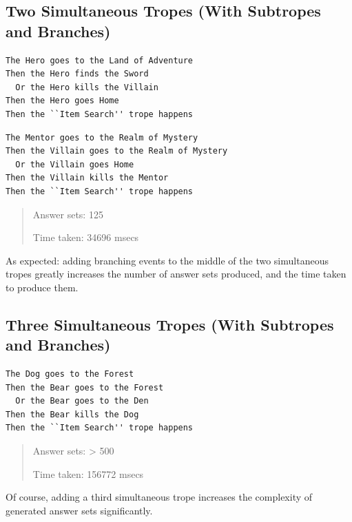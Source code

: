 \documentclass[11pt]{report}
\begin{document}
\subsection{Two Simultaneous Tropes (With Subtropes and Branches)}

\begin{lstlisting}[showstringspaces=false, label={lst:ex-simtrope1b},
caption={First of two simultaneous tropes (with subtropes and branches)}]
The Hero goes to the Land of Adventure
Then the Hero finds the Sword
  Or the Hero kills the Villain
Then the Hero goes Home
Then the ``Item Search'' trope happens
\end{lstlisting}

\begin{lstlisting}[showstringspaces=false, label={lst:ex-simtrope2b},
caption={Second of two simultaneous tropes (with subtropes and branches)}]
The Mentor goes to the Realm of Mystery
Then the Villain goes to the Realm of Mystery
  Or the Villain goes Home
Then the Villain kills the Mentor
Then the ``Item Search'' trope happens
\end{lstlisting}

\begin{quote}
Answer sets: 125

Time taken: 34696 msecs
\end{quote}

As expected: adding branching events to the middle of the two simultaneous
tropes greatly increases the number of answer sets produced, and the time taken
to produce them.

\subsection{Three Simultaneous Tropes (With Subtropes and Branches)}

\begin{lstlisting}[showstringspaces=false, label={lst:ex-simtrope3},
caption={Third of three simultaneous tropes (with subtropes and branches)}]
The Dog goes to the Forest
Then the Bear goes to the Forest
  Or the Bear goes to the Den
Then the Bear kills the Dog
Then the ``Item Search'' trope happens
\end{lstlisting}

\begin{quote}
Answer sets: > 500

Time taken: 156772 msecs
\end{quote}

Of course, adding a third simultaneous trope increases the complexity of
generated answer sets significantly.
\end{document}
